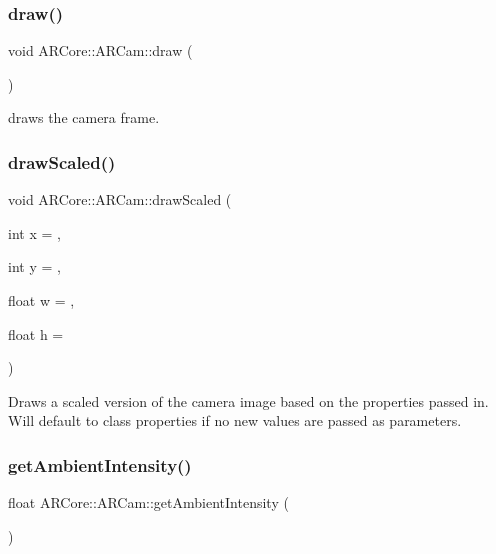 \subsubsection{\texorpdfstring{draw()}{draw()}}
{\footnotesize\ttfamily void A\+R\+Core\+::\+A\+R\+Cam\+::draw (\begin{DoxyParamCaption}{ }\end{DoxyParamCaption})}



draws the camera frame. 

\mbox{\label{class_a_r_core_1_1_a_r_cam_a5512aeae7ea9edb7daf9c9c07d15d402}} 
\subsubsection{\texorpdfstring{draw\+Scaled()}{drawScaled()}}
{\footnotesize\ttfamily void A\+R\+Core\+::\+A\+R\+Cam\+::draw\+Scaled (\begin{DoxyParamCaption}\item[{int}]{x = {},  }\item[{int}]{y = {},  }\item[{float}]{w = {},  }\item[{float}]{h = {} }\end{DoxyParamCaption})}

Draws a scaled version of the camera image based on the properties passed in. Will default to class properties if no new values are passed as parameters. \mbox{\label{class_a_r_core_1_1_a_r_cam_a98cb7f152cbc3028d258705da1591a55}} 
\subsubsection{\texorpdfstring{get\+Ambient\+Intensity()}{getAmbientIntensity()}}
{\footnotesize\ttfamily float A\+R\+Core\+::\+A\+R\+Cam\+::get\+Ambient\+Intensity (\begin{DoxyParamCaption}{ }\end{DoxyParamCaption})}



